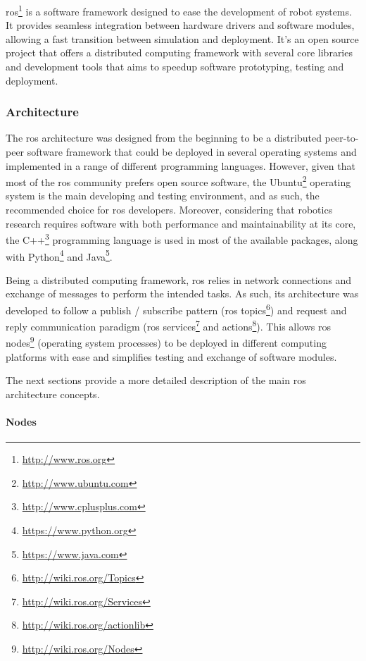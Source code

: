 \gls{ros}\footnote{\url{http://www.ros.org}} \cite{Quigley2009} is a software framework designed to ease the development of robot systems. It provides seamless integration between hardware drivers and software modules, allowing a fast transition between simulation and deployment. It's an open source project that offers a distributed computing framework with several core libraries and development tools that aims to speedup software prototyping, testing and deployment.


\subsubsection{Architecture}

The \gls{ros} architecture was designed from the beginning to be a distributed peer-to-peer software framework that could be deployed in several operating systems and implemented in a range of different programming languages. However, given that most of the \gls{ros} community prefers open source software, the Ubuntu\footnote{\url{http://www.ubuntu.com}} operating system is the main developing and testing environment, and as such, the recommended choice for \gls{ros} developers. Moreover, considering that robotics research requires software with both performance and maintainability at its core, the C++\footnote{\url{http://www.cplusplus.com}} programming language is used in most of the available packages, along with Python\footnote{\url{https://www.python.org}} and Java\footnote{\url{https://www.java.com}}.

Being a distributed computing framework, \gls{ros} relies in network connections and exchange of messages to perform the intended tasks. As such, its architecture was developed to follow a publish / subscribe pattern (\gls{ros} topics\footnote{\url{http://wiki.ros.org/Topics}}) and request and reply communication paradigm (\gls{ros} services\footnote{\url{http://wiki.ros.org/Services}} and actions\footnote{\url{http://wiki.ros.org/actionlib}}). This allows \gls{ros} nodes\footnote{\url{http://wiki.ros.org/Nodes}} (operating system processes) to be deployed in different computing platforms with ease and simplifies testing and exchange of software modules.

The next sections provide a more detailed description of the main \gls{ros} architecture concepts.


\paragraph{Nodes}

